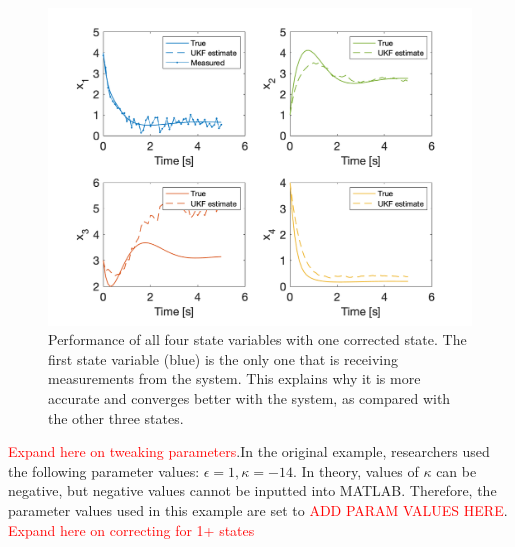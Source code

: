 \newpage

\begin{figure}[h]
    \centering
    \includegraphics[scale = 0.6]{Meskin_states.png}
    \caption{Performance of all four state variables with one corrected state. The first state variable (blue) is the only one that is receiving measurements from the system. This explains why it is more accurate and converges better with the system, as compared with the other three states.}
    \label{map}
\end{figure}




\noindent \textcolor{red}{Expand here on tweaking parameters}.In the original example, researchers used the following parameter values: $\epsilon = 1, \kappa = -14$. In theory, values of $\kappa$ can be negative, but negative values cannot be inputted into MATLAB. Therefore, the parameter values used in this example are set to \noindent \textcolor{red}{ADD PARAM VALUES HERE}.\\


\noindent \textcolor{red}{Expand here on correcting for 1+ states}













